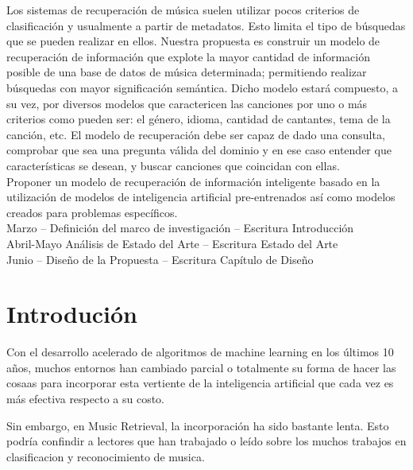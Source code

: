 \documentclass[11pt,a4paper,oldfontcommands]{memoir}
\begin{document}
\clearpage
\begin{multicols}{2}
Los sistemas de recuperación de música suelen utilizar pocos criterios de clasificación y usualmente a partir de metadatos. Esto limita el tipo de búsquedas que se pueden realizar en ellos. Nuestra propuesta es construir un modelo de recuperación de información que explote la mayor cantidad de información posible de una base de datos de música determinada; permitiendo realizar búsquedas con mayor significación semántica. Dicho modelo estará compuesto, a su vez, por diversos modelos que caractericen las canciones por uno o más criterios como pueden ser: el género, idioma, cantidad de cantantes, tema de la canción, etc. El modelo de recuperación debe ser capaz de dado una consulta, comprobar que sea una pregunta válida del dominio y en ese caso entender que características se desean, y buscar canciones que coincidan con ellas.
\\[1em]
Proponer un modelo de recuperación de información inteligente basado en la utilización de modelos de inteligencia artificial pre-entrenados así como modelos creados para problemas específicos. 
\\[1em]
Marzo –  Definición del marco de investigación – Escritura Introducción \\
Abril-Mayo  Análisis de Estado del Arte – Escritura Estado del Arte \\
Junio  –  Diseño de la Propuesta – Escritura Capítulo de Diseño \\


\section{Introdución}
Con el desarrollo acelerado de algoritmos de machine learning en los últimos 10 años, 
muchos entornos han cambiado parcial o totalmente su forma de hacer las cosaas para incorporar
esta vertiente de la inteligencia artificial que cada vez es más efectiva respecto a su costo. 

Sin embargo, en Music Retrieval, la incorporación ha sido bastante lenta. Esto podría confindir 
a lectores que han trabajado o leído sobre los muchos trabajos en clasificacion y reconocimiento de musica.



\end{multicols}
\end{document}
